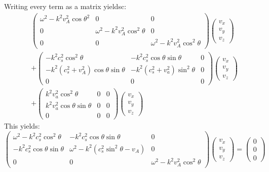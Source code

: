 \documentclass[a4paper]{article}
\begin{document}
Writing every term as a matrix yieldsc:
\begin{align*}
	&\begin{pmatrix}
		\omega^2  - k^2 v_A^2 \cos\theta^2    & 0 & 0 \\
		0 & \omega^2 - k^2v_A^2\cos^2\theta & 0 \\
		0 & 0 & \omega^2 - k^2v_A^2\cos^2\theta
	\end{pmatrix} 
	\begin{pmatrix} v_x \\ v_y \\ v_z \end{pmatrix} \\
	 & + \begin{pmatrix} 
		 -k^2 c_s^2 \cos^2 \theta & - k^2 c_s^2 \cos\theta \sin \theta  & 0 \\
		 -k^2(c_s^2 + v_A^2) \cos\theta \sin \theta & -k^2(c_s^2 + v_a^2) \sin^2\theta & 0 \\
		 0 & 0 & 0
	 \end{pmatrix} \begin{pmatrix} v_x \\ v_y \\ v_z \end{pmatrix} \\  
	 &  + \begin{pmatrix} 
		 k^2 v_a^2 \cos^2\theta & 0 & 0  \\
		 k^2 v_a^2 \cos \theta \sin \theta & 0 & 0 \\
		 0 & 0 & 0
	 \end{pmatrix} \begin{pmatrix} v_x \\ v_y \\ v_z \end{pmatrix} 
\end{align*}
This yields:
\begin{equation}\label{eq:MHD_linear_matrix}
	\begin{pmatrix}
		\omega^2  - k^2 c_s^2 \cos^2\theta   & -k^2c_s^2\cos\theta \sin \theta & 0 \\
		-k^2 c_s^2 \cos\theta \sin \theta & \omega^2 - k^2(c_s^2\sin^2\theta - v_A)   & 0 \\
		0 & 0 & \omega^2 - k^2v_A^2\cos^2\theta
	\end{pmatrix} 
	\begin{pmatrix} v_x \\ v_y \\ v_z \end{pmatrix} 
	 = \begin{pmatrix} 0 \\ 0 \\0  \end{pmatrix} 
\end{equation}
\end{document}
